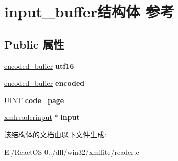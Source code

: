 \hypertarget{structinput__buffer}{}\section{input\+\_\+buffer结构体 参考}
\label{structinput__buffer}
\subsection*{Public 属性}
\begin{DoxyCompactItemize}
\item 
\mbox{\label{structinput__buffer_a4c1c0a96ac9c52a6608718cb385477ca}} 
\hyperlink{structencoded__buffer}{encoded\+\_\+buffer} {\bfseries utf16}
\item 
\mbox{\label{structinput__buffer_abce40a37546be68761b4e77b0666d785}} 
\hyperlink{structencoded__buffer}{encoded\+\_\+buffer} {\bfseries encoded}
\item 
\mbox{\label{structinput__buffer_ac9a8a31e6a132eb02d3a699e6670fff5}} 
U\+I\+NT {\bfseries code\+\_\+page}
\item 
\mbox{\label{structinput__buffer_a71f5364a4c4f444b4ca96e7a630d79ca}} 
\hyperlink{structxmlreaderinput}{xmlreaderinput} $\ast$ {\bfseries input}
\end{DoxyCompactItemize}


该结构体的文档由以下文件生成\+:\begin{DoxyCompactItemize}
\item 
E\+:/\+React\+O\+S-\/0../dll/win32/xmllite/reader.\+c\end{DoxyCompactItemize}
